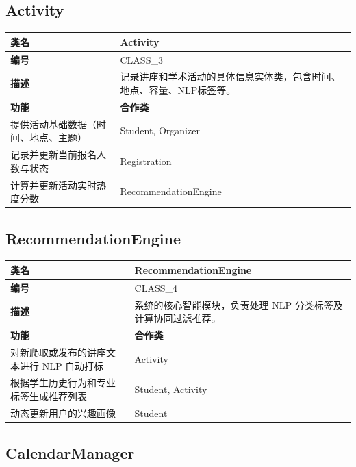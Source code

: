 \documentclass[UTF8,a4paper,12pt,fontset=none]{ctexrep}
\begin{document}
\subsection{Activity}

\begingroup
\small
\begin{longtable}{|>{\raggedright\arraybackslash}p{}|>{\raggedright\arraybackslash}p{}|}
\hline
\textbf{类名} & \textbf{Activity} \\
\hline
\textbf{编号} & CLASS\_3 \\
\hline
\textbf{描述} & 记录讲座和学术活动的具体信息实体类，包含时间、地点、容量、NLP标签等。 \\
\hline
\textbf{功能} & \textbf{合作类} \\
\hline
提供活动基础数据（时间、地点、主题） & Student, Organizer \\
\hline
记录并更新当前报名人数与状态 & Registration \\
\hline
计算并更新活动实时热度分数 & RecommendationEngine \\
\hline
\end{longtable}
\endgroup

\subsection{RecommendationEngine}

\begingroup
\small
\begin{longtable}{|>{\raggedright\arraybackslash}p{}|>{\raggedright\arraybackslash}p{}|}
\hline
\textbf{类名} & \textbf{RecommendationEngine} \\
\hline
\textbf{编号} & CLASS\_4 \\
\hline
\textbf{描述} & 系统的核心智能模块，负责处理 NLP 分类标签及计算协同过滤推荐。 \\
\hline
\textbf{功能} & \textbf{合作类} \\
\hline
对新爬取或发布的讲座文本进行 NLP 自动打标 & Activity \\
\hline
根据学生历史行为和专业标签生成推荐列表 & Student, Activity \\
\hline
动态更新用户的兴趣画像 & Student \\
\hline
\end{longtable}
\endgroup

\subsection{CalendarManager}
\end{document}
